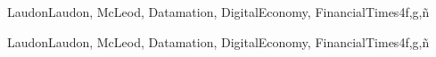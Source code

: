 \begin{syllabus}
\begin{unit}{\SPIntellectualProperty}{}{LaudonLaudon, McLeod, Datamation, DigitalEconomy, FinancialTimes}{4}{f,g,ñ}
	\begin{learningoutcomes}%
        \item \SPIntellectualPropertyLODiscussTheOf [\Assessment]
        \item \SPIntellectualPropertyLODiscussTheTheOf [\Familiarity]
        \item \SPIntellectualPropertyLODescribeLegislation [\Assessment]
        \item \SPIntellectualPropertyLOCritiqueLegislation [\Familiarity]
        \item \SPIntellectualPropertyLOIdentifyContemporary [\Assessment]
        \item \SPIntellectualPropertyLOJustify [\Assessment] [\Familiarity]
        \item \SPIntellectualPropertyLOEvaluateTheInherent [\Familiarity]
        \item \SPIntellectualPropertyLOInterpretTheImplementation [\Familiarity]
        \item \SPIntellectualPropertyLODiscussTheInPatents [\Familiarity]
        \item \SPIntellectualPropertyLOCharacterizeAndConcepts [\Familiarity]
        \item \SPIntellectualPropertyLOIdentifyTheTheMovement [\Assessment]
        \item \SPIntellectualPropertyLOIdentifyTheOf [\Familiarity]
	\end{learningoutcomes}
\end{unit}

\begin{unit}{\SPPrivacyandCivilLiberties}{}{LaudonLaudon, McLeod, Datamation, DigitalEconomy, FinancialTimes}{4}{f,g,ñ}
	\begin{topics}
        \item \SPPrivacyandCivilLibertiesTopicPhilosophicalFoundations
        \item \SPPrivacyandCivilLibertiesTopicLegalFoundations
        \item \SPPrivacyandCivilLibertiesTopicPrivacy
        \item \SPPrivacyandCivilLibertiesTopicRamifications
        \item \SPPrivacyandCivilLibertiesTopicTechnology
        \item \SPPrivacyandCivilLibertiesTopicPrivacyLegislation
        \item \SPPrivacyandCivilLibertiesTopicCivil
        \item \SPPrivacyandCivilLibertiesTopicFreedom
	\end{topics}


\end{unit}
\end{syllabus}
